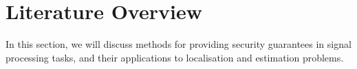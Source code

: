 \documentclass[10pt,journal,compsoc]{IEEEtran}
\theoremstyle{definition}
\theoremstyle{definition}
\theoremstyle{remark}
\begin{document}
\section{Literature Overview}
In this section, we will discuss methods for providing security guarantees in signal processing tasks, and their applications to localisation and estimation problems.

% 
% 
\end{document}
